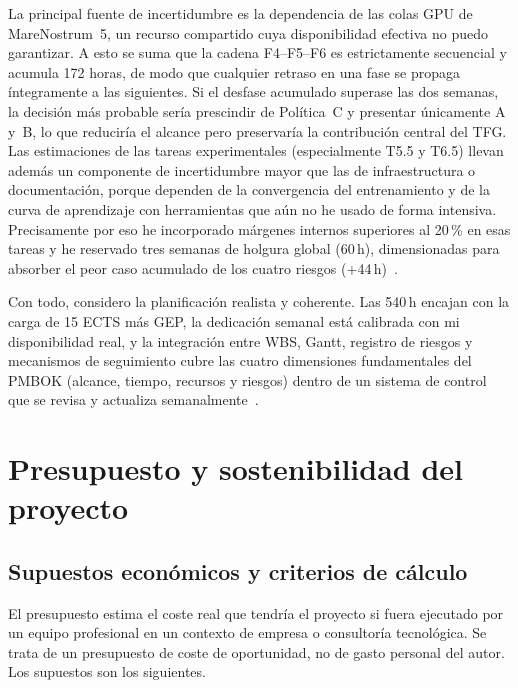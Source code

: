 La principal fuente de incertidumbre es la dependencia de las colas GPU de MareNostrum~5, un recurso compartido cuya disponibilidad efectiva no puedo garantizar. A esto se suma que la cadena F4--F5--F6 es estrictamente secuencial y acumula 172 horas, de modo que cualquier retraso en una fase se propaga íntegramente a las siguientes. Si el desfase acumulado superase las dos semanas, la decisión más probable sería prescindir de Política~C y presentar únicamente A y~B, lo que reduciría el alcance pero preservaría la contribución central del TFG. Las estimaciones de las tareas experimentales (especialmente T5.5 y T6.5) llevan además un componente de incertidumbre mayor que las de infraestructura o documentación, porque dependen de la convergencia del entrenamiento y de la curva de aprendizaje con herramientas que aún no he usado de forma intensiva. Precisamente por eso he incorporado márgenes internos superiores al 20\,\% en esas tareas y he reservado tres semanas de holgura global (60\,h), dimensionadas para absorber el peor caso acumulado de los cuatro riesgos (+44\,h)~\cite{pmbok}.

Con todo, considero la planificación realista y coherente. Las 540\,h encajan con la carga de 15 ECTS más GEP, la dedicación semanal está calibrada con mi disponibilidad real, y la integración entre WBS, Gantt, registro de riesgos y mecanismos de seguimiento cubre las cuatro dimensiones fundamentales del PMBOK (alcance, tiempo, recursos y riesgos) dentro de un sistema de control que se revisa y actualiza semanalmente~\cite{gep23,gpi}.

\section{Presupuesto y sostenibilidad del proyecto}

\subsection{Supuestos económicos y criterios de cálculo}

El presupuesto estima el coste real que tendría el proyecto si fuera ejecutado por un equipo profesional en un contexto de empresa o consultoría tecnológica. Se trata de un presupuesto de coste de oportunidad, no de gasto personal del autor. Los supuestos son los siguientes.

